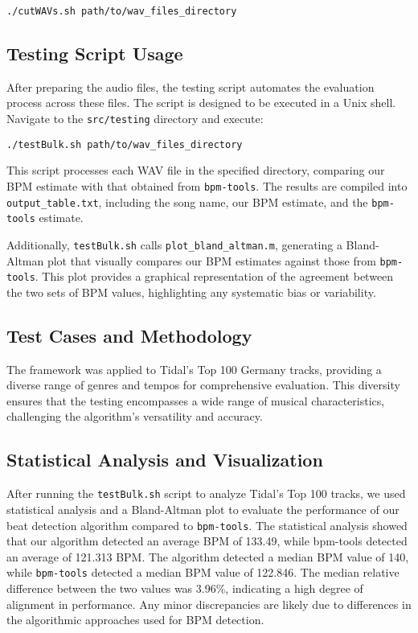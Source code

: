 \lstset{style=ShellStyle}
\begin{lstlisting}[caption={Trimming WAV Files}, label=lst]
./cutWAVs.sh path/to/wav_files_directory
\end{lstlisting}

\subsection{Testing Script Usage}

After preparing the audio files, the testing script automates the evaluation process across these files. The script is designed to be executed in a Unix shell. Navigate to the \texttt{src/testing} directory and execute:

\lstset{style=ShellStyle}
\begin{lstlisting}[caption={Executing the Testing Framework}, label=lst]
./testBulk.sh path/to/wav_files_directory
\end{lstlisting}

This script processes each WAV file in the specified directory, comparing our BPM estimate with that obtained from \texttt{bpm-tools}. The results are compiled into \texttt{output\_table.txt}, including the song name, our BPM estimate, and the \texttt{bpm-tools} estimate.

Additionally, \texttt{testBulk.sh} calls \texttt{plot\_bland\_altman.m}, generating a Bland-Altman plot that visually compares our BPM estimates against those from \texttt{bpm-tools}. This plot provides a graphical representation of the agreement between the two sets of BPM values, highlighting any systematic bias or variability.

\subsection{Test Cases and Methodology}

The framework was applied to Tidal's Top 100 Germany tracks, providing a diverse range of genres and tempos for comprehensive evaluation. This diversity ensures that the testing encompasses a wide range of musical characteristics, challenging the algorithm's versatility and accuracy.

\subsection{Statistical Analysis and Visualization}

After running the \texttt{testBulk.sh} script to analyze Tidal's Top 100 tracks, we used statistical analysis and a Bland-Altman plot to evaluate the performance of our beat detection algorithm compared to \texttt{bpm-tools}. The statistical analysis showed that our algorithm detected an average BPM of 133.49, while bpm-tools detected an average of 121.313 BPM. The algorithm detected a median BPM value of 140, while \texttt{bpm-tools} detected a median BPM value of 122.846. The median relative difference between the two values was 3.96\%, indicating a high degree of alignment in performance. Any minor discrepancies are likely due to differences in the algorithmic approaches used for BPM detection.

